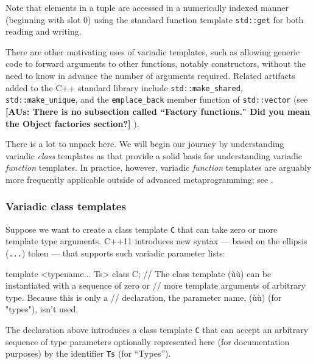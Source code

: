 \noindent Note that elements in a tuple are accessed in a numerically indexed
manner (beginning with slot 0) using the standard function template
\lstinline!std::get! for both reading and writing.

There are other motivating uses of variadic templates, such as allowing
generic code to forward arguments to other functions, notably
constructors, without the need to know in advance the number of
arguments required. Related artifacts added to the C++ standard library
include \lstinline!std::make_shared!, \lstinline!std::make_unique!, and the
\lstinline!emplace_back! member function of \lstinline!std::vector! (see
 \textbf{ [AUs: There is no subsection called ``Factory functions." Did you mean the Object factories section?]} ).

There is a lot to unpack here. We will begin our journey by
understanding variadic \emph{class} templates as 
that provide a solid basis for understanding variadic \emph{function}
templates. In practice, however, variadic \emph{function} templates are
arguably more frequently applicable outside of advanced metaprogramming;
see .

\subsubsection[Variadic class templates]{Variadic class templates}\label{variadic-class-templates}

Suppose we want to create a class template \lstinline!C! that can take zero
or more template type arguments. C++11 introduces new syntax --- based
on the ellipsis (\lstinline!...!) token --- that supports such variadic
parameter lists:

\begin{emcppslisting}
template <typename... Ts> class C;
    // The class template (ù{}ù) can be instantiated with a sequence of zero or
    // more template arguments of arbitrary type. Because this is only a
    // declaration, the parameter name, (ù{}ù) (for "types"), isn't used.
\end{emcppslisting}
    

\noindent The declaration above introduces a class template \lstinline!C! that can
accept an arbitrary sequence of type parameters optionally represented
here (for documentation purposes) by the identifier \lstinline!Ts! (for
``Types'').


